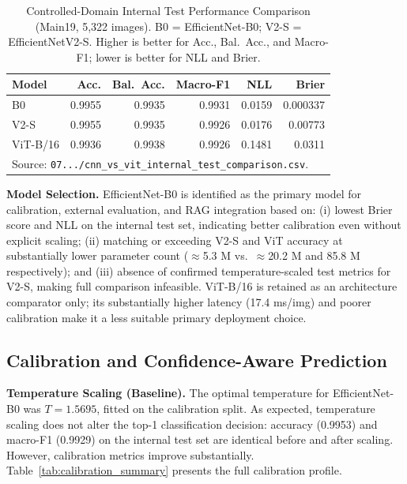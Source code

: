 \documentclass[conference]{IEEEtran}
\begin{document}
\begin{table}[t]
\caption{Controlled-Domain Internal Test Performance Comparison (Main19,
5,322 images). B0 = EfficientNet-B0; V2-S = EfficientNetV2-S. Higher is better
for Acc., Bal.\ Acc., and Macro-F1; lower is better for NLL and Brier.}
\label{tab:internal_comparison}
\centering
\setlength{\tabcolsep}{3pt}
\begin{tabular}{lrrrrr}
\toprule
\textbf{Model} & \textbf{Acc.} & \textbf{Bal.\ Acc.} & \textbf{Macro-F1} & \textbf{NLL} & \textbf{Brier} \\
\midrule
B0 & 0.9955 & 0.9935 & 0.9931 & 0.0159 & 0.000337 \\
V2-S & 0.9955 & 0.9935 & 0.9926 & 0.0176 & 0.00773 \\
ViT-B/16 & 0.9936 & 0.9938 & 0.9926 & 0.1481 & 0.0311 \\
\bottomrule
\multicolumn{6}{l}{\small Source: \texttt{07.../cnn\_vs\_vit\_internal\_test\_comparison.csv}.} \\
\end{tabular}
\end{table}

\textbf{Model Selection.}
EfficientNet-B0 is identified as the primary model for calibration, external
evaluation, and RAG integration based on: (i) lowest Brier score and NLL on the
internal test set, indicating better calibration even without explicit scaling;
(ii) matching or exceeding V2-S and ViT accuracy at substantially lower
parameter count ($\approx$5.3 M vs.\ $\approx$20.2 M and 85.8 M respectively);
and (iii) absence of confirmed temperature-scaled test metrics for V2-S, making
full comparison infeasible. ViT-B/16 is retained as an architecture comparator
only; its substantially higher latency (17.4 ms/img) and poorer calibration
make it a less suitable primary deployment choice.

\subsection{Calibration and Confidence-Aware Prediction}

\textbf{Temperature Scaling (Baseline).}
The optimal temperature for EfficientNet-B0 was $T=1.5695$, fitted on the
calibration split. As expected, temperature scaling does not alter the top-1
classification decision: accuracy (0.9953) and macro-F1 (0.9929) on the internal
test set are identical before and after scaling. However, calibration metrics
improve substantially. Table~\ref{tab:calibration_summary} presents the full
calibration profile.
\end{document}

